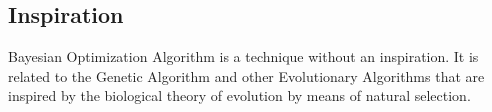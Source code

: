 \subsection{Inspiration}
Bayesian Optimization Algorithm is a technique without an inspiration. It is related to the Genetic Algorithm and other Evolutionary Algorithms that are inspired by the biological theory of evolution by means of natural selection.


